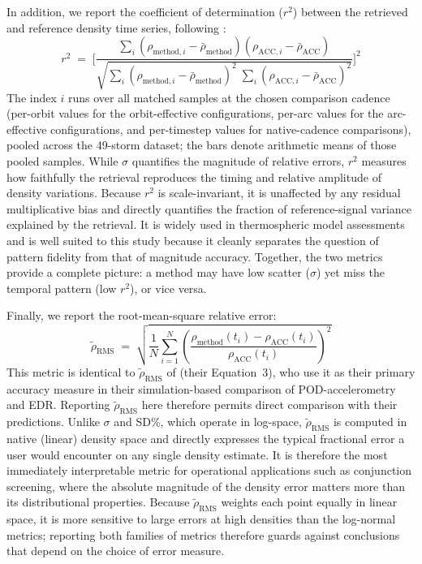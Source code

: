 \documentclass{agujournal2019}
\begin{document}
In addition, we report the coefficient of determination ($r^{2}$) between
the retrieved and reference density time series, following
:
\begin{equation}
r^{2} \;=\; \biggl[\frac{
  \sum_{i}(\rho_{\text{method},i} - \bar{\rho}_{\text{method}})
         (\rho_{\text{ACC},i} - \bar{\rho}_{\text{ACC}})
}{
  \sqrt{\sum_{i}(\rho_{\text{method},i} - \bar{\rho}_{\text{method}})^{2}
        \;\sum_{i}(\rho_{\text{ACC},i} - \bar{\rho}_{\text{ACC}})^{2}}
}\biggr]^{2}
\end{equation}
The index $i$ runs over all matched samples at the chosen comparison cadence
(per-orbit values for the orbit-effective configurations, per-arc values for
the arc-effective configurations, and per-timestep values for native-cadence
comparisons), pooled across the 49-storm dataset; the bars denote arithmetic
means of those pooled samples.
While $\sigma$ quantifies the magnitude of relative errors, $r^{2}$
measures how faithfully the retrieval reproduces the timing and relative
amplitude of density variations. Because $r^{2}$ is scale-invariant, it
is unaffected by any residual multiplicative bias and directly quantifies
the fraction of reference-signal variance explained by the retrieval.
It is widely used in thermospheric model assessments
\cite{Bruinsma2021ThermosphereStorms, Bruinsma2018SpaceOrbit} and is
well suited to this study because it cleanly separates the question of
pattern fidelity from that of magnitude accuracy.
Together, the two metrics provide a complete picture: a method may have
low scatter ($\sigma$) yet miss the temporal pattern (low $r^{2}$), or
vice versa.

Finally, we report the root-mean-square relative error:
\begin{equation}
\tilde{\rho}_{\text{RMS}} \;=\; \sqrt{\frac{1}{N}\sum_{i=1}^{N}
  \left(\frac{\rho_{\text{method}}(t_i) - \rho_{\text{ACC}}(t_i)}
             {\rho_{\text{ACC}}(t_i)}\right)^{\!2}}
\end{equation}
This metric is identical to $\tilde{\rho}_{\text{RMS}}$ of
 (their Equation~3), who use it as their primary
accuracy measure in their simulation-based comparison of POD-accelerometry
and EDR. Reporting $\tilde{\rho}_{\text{RMS}}$ here therefore permits
direct comparison with their predictions. Unlike $\sigma$ and SD\%, which
operate in log-space, $\tilde{\rho}_{\text{RMS}}$ is computed in native
(linear) density space and directly expresses the typical fractional error a
user would encounter on any single density estimate. It is therefore the
most immediately interpretable metric for operational applications such as
conjunction screening, where the absolute magnitude of the density error
matters more than its distributional properties. Because
$\tilde{\rho}_{\text{RMS}}$ weights each point equally in linear space, it
is more sensitive to large errors at high densities than the log-normal
metrics; reporting both families of metrics therefore guards against
conclusions that depend on the choice of error measure.
\end{document}
